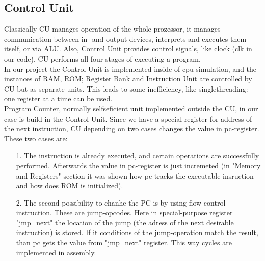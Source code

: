 \documentclass[11pt,a4paper]{article}
\begin{document}
\newpage
\subsection{Control Unit}
Classically CU manages operation of the whole prozessor, it manages communication between in- and output devices, interprets and executes them itself, or via ALU. Also, Control Unit provides control signals, like clock (clk in our code). CU performs all four stages of executing a program.\\
In our project the Control Unit is implemented inside of cpu-simulation, and the instances of RAM, ROM; Register Bank and Instruction Unit are controlled by CU but as separate units. This leads to some inefficiency, like singlethreading: one register at a time can be used.\\
Program Counter, normally selfseficient unit implemented outside the CU, in our case is build-in the Control Unit. Since we have a special register for address of the next instruction, CU depending on two cases changes the value in pc-register. These two cases are:
\begin{enumerate}
	\item[1.] The instruction is already executed, and certain operations are successfully performed. Afterwards the value in pc-register is just incremeted (in "Memory and Registers" section it was shown how pc tracks the executable insruction and how does ROM is initialized). 
	\item[2.] The second possibility to chanhe the PC is by using flow control instruction. These are jump-opcodes. Here in special-purpose register "jmp\_next" the location of the jump (the adress of the next desirable instruction) is stored. If it conditions of the jump-operation match the result, than pc gets the value from "jmp\_next" register. This way cycles are implemented in assembly.
\end{enumerate} 
\end{document}
